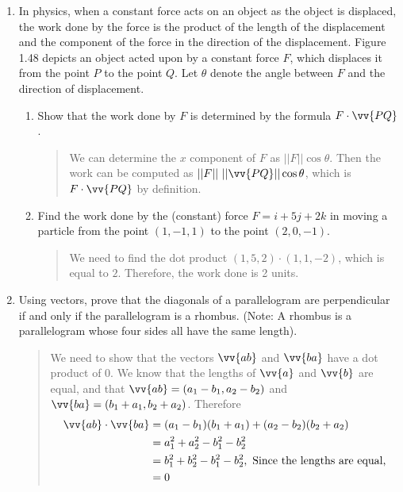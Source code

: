 \documentclass{hw}
\begin{document}
\begin{enumerate}
\item In physics, when a constant force acts on an object as the object is displaced, the work done by
the force is the product of the length of the displacement and the component of the force in the
direction of the displacement. Figure 1.48 depicts an object acted upon by a constant force $F$, which
displaces it from the point $P$ to the point $Q$. Let $\theta$ denote the angle between $F$ and the
direction of
displacement.
\begin{enumerate}
\item Show that the work done by $F$ is determined by the formula $F\cdot\vv{PQ}$.
\begin{quote}
We can determine the $x$ component of $F$ as $||F||\cos{\theta}$. Then the work can be computed as
$||F||\ ||\vv{PQ}||\cos{\theta}$, which is $F\cdot\vv{PQ}$ by definition.
\end{quote}
\item Find the work done by the (constant) force $F = i + 5j + 2k$ in moving a particle from the point
$(1, -1, 1)$ to the point $(2, 0, -1)$.
\begin{quote}
We need to find the dot product $(1,5,2)\cdot(1,1,-2)$, which is equal to $2$. Therefore, the work done
is 2 units.
\end{quote}
\end{enumerate}

\item Using vectors, prove that the diagonals of a parallelogram are perpendicular if and only if the
parallelogram is a rhombus. (Note: A rhombus is a parallelogram whose four sides all have the same
length).
\begin{quote}
We need to show that the vectors $\vv{ab}$ and $\vv{ba}$ have a dot product of 0. We know that the
lengths of $\vv{a}$ and $\vv{b}$ are equal, and that $\vv{ab} = (a_{1} - b_{1}, a_{2} - b_{2})$ and
$\vv{ba} = (b_{1} + a_{1}, b_{2} + a_{2})$. Therefore
\begin{align*}
\vv{ab}\cdot\vv{ba} &= (a_{1} - b_{1})(b_{1} + a_{1}) + (a_{2} - b_{2})(b_{2} + a_{2})\\
&= a_{1}^{2}+a_{2}^{2}-b_{1}^{2}-b_{2}^{2}\\
&= b_{1}^{2}+b_{2}^{2}-b_{1}^{2}-b_{2}^{2},\text{ Since the lengths are equal,}\\
&= 0
\end{align*}
\end{quote}
\end{enumerate}
\end{document}
